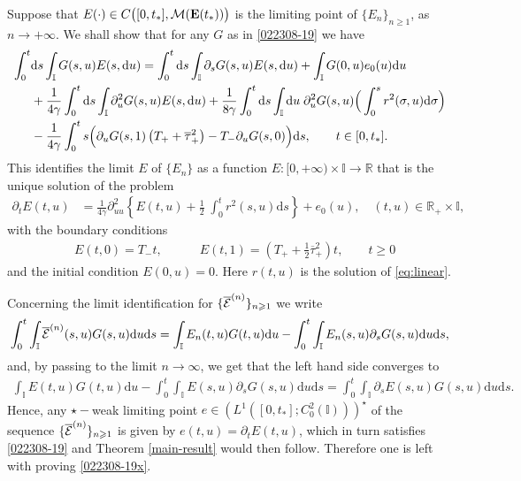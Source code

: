 \documentclass[EJP]{ejpecp} %
\newcommand\R{{\mathbb R}}
\newcommand\T{{\mathbb I}}
\newcommand \ga{\gamma}
\renewcommand{\ge}{\geqslant}
\newcommand{\dd  }{\mathrm{d}}
\renewcommand{\bar}{\overline}
\numberwithin{equation}{section}
\begin{document}
Suppose that   $E(\cdot)  \in C\big([0,t_*],{\cal M}(\mathbf{E}(t_*))\big)$ is the limiting point of $\{E_n\}_{n\geq 1}$, as
$n\to+\infty$.
We shall show that for any
$G$ as in \eqref{022308-19} we have
\begin{align}
\label{022308-19x} 
 \int_0^t &\dd s \int_{\T}G(s,u)E(s,\dd u) \notag  =\int_0^{t}\dd s\int_{\T}\partial_s G(s,u)E(s,\dd u ) +\int_{\T} G(0,u)e_0(u)\dd u\notag \\
&
+
\frac1{4\ga} \int_0^{t} \dd s  \int_{\T} 
    \partial_u^2G(s, u) E(s,\dd u)+ \frac {1}{8\ga}\int_0^{t} \dd s \int_{\T}  \dd u\; \partial_u^2 G(s,u)
\Big( \int_0^s  r^2(\sigma,u)\dd \sigma\Big) \notag \\
   & - \frac{1}{4\ga} \int_0^ts\Big(\partial_uG(s,1) \left( T_+
       + \bar\tau_+^2\right)
     -T_-\partial_uG(s,0) \Big)\dd s,\qquad t\in[0,t_*].
  \end{align}
This identifies the limit $E$ of $\{E_n\}$ as a function
$E:[0,+\infty)\times\T\to\R$ that is
the unique solution of
the problem
\begin{align}
   \partial_t E (t,u)& =  \frac 1{4\ga}  \partial^2_{uu}
   \left\{  E(t,u) +
       \frac 12\; \int_0^tr^2(s,u)\dd s\right\}+e_0(u),\quad
        (t,u)\in \R_+\times \T ,
\label{eq:linear2x}
      \end{align}
with the boundary conditions
\begin{equation}
  \label{eq:bcx}
  \begin{split}
   &E (t,0) = T_- t, \qquad \quad  E(t,1) = \left(T_+ +
     \frac12\bar\tau_+^2\right)t,\qquad t\ge0
  \end{split}
\end{equation}
and
 the initial condition $E(0,u) =0$. Here $r(t,u)$ is the solution of   \eqref{eq:linear}.




Concerning the limit identification for $\{\bar {\cal
    E}^{(n)}\}_{n\ge1}$ we write
\begin{align*}
\int_0^{t}\int_{\T}\bar {\cal E}^{(n)}(s,u) G(s,u)\dd u \dd s= \int_{\T}E_n(t,u)G(t,u) \dd u-\int_0^{t}\int_{\T}E_n(s,u)\partial_s G(s,u)\dd u \dd s,
\end{align*}
and, by passing to the limit $n\to\infty$, we get that the left hand side converges to 
\begin{align*}
 \int_{\T} E(t,u)G(t,u) \dd u
-\int_0^{t}\int_{\T}E(s,u)\partial_s G(s,u)\dd u \dd s
   =\int_0^{t}\int_{\T}\partial_s E(s,u)G(s,u)\dd
  u \dd s.
\end{align*}
Hence, any   $\star-$weak limiting point 
$e\in (L^1([0,t_*];C_{0}^2(\T)))^\star$ of the sequence $\{\bar {\cal
    E}^{(n)}\}_{n\ge1}$
is 
given by $e(t,u)=\partial_t E(t,u)$, which in turn satisfies
\eqref{022308-19} and Theorem \ref{main-result} would then follow. Therefore one is left with proving \eqref{022308-19x}.
\end{document}
